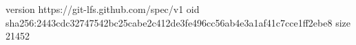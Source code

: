 version https://git-lfs.github.com/spec/v1
oid sha256:2443cdc32747542bc25cabe2c412de3fe496cc56ab4e3a1af41c7cce1ff2ebe8
size 21452
